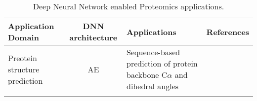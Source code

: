 \begin{table}[h!]
\centering
\begin{tabular}{|| l | c | l | l ||}
    \hline
    Application Domain & DNN architecture & Applications & References\\
    \hline \hline
    Preotein structure prediction & AE & Sequence-based prediction of protein backbone C$\alpha$ and dihedral angles & \\
    &
    \hline
\end{tabular}
\caption{Deep Neural Network enabled Proteomics applications.}
\label{tab:PS-DNN}
\end{table}